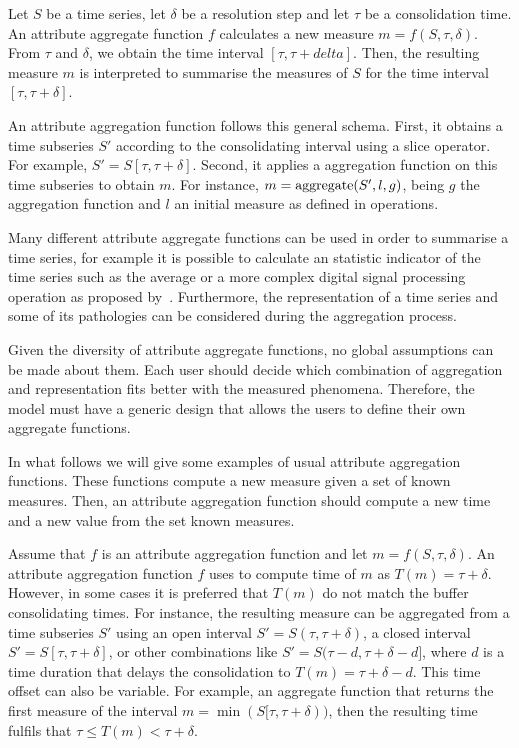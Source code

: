 Let $S$ be a time series, let $\delta$ be a resolution step and let
$\tau$ be a consolidation time.  An attribute aggregate function $f$
calculates a new measure $m=f(S,\tau,\delta)$. From $\tau$ and
$\delta$, we obtain the time interval $[\tau,\tau+delta]$.  Then, the
resulting measure $m$ is interpreted to summarise the measures of $S$
for the time interval $[\tau,\tau+\delta]$.




An attribute aggregation function follows this general schema. First,
it obtains a time subseries $S'$ according to the consolidating
interval using a slice operator. For example, $S' =
S[\tau,\tau+\delta]$. Second, it applies a  aggregation
function on this time subseries to obtain $m$. For instance, $m =
\operatorname*{aggregate}(S',l, g)$, being $g$ the aggregation function and $l$ an initial
measure as defined in  operations.

Many different attribute aggregate functions can be used in order to
summarise a time series, for example it is possible to calculate an
statistic indicator of the time series such as the average or a more
complex digital signal processing operation as proposed
by~\cite{zhang11}. Furthermore, the representation of a time series
and some of its pathologies can be considered during the aggregation
process.

Given the diversity of attribute aggregate functions, no global
assumptions can be made about them. Each user should decide which
combination of aggregation and representation fits better with the
measured phenomena.  Therefore, the  model must have a
generic design that allows the users to define their own aggregate
functions.

In what follows we will give some examples of usual attribute
aggregation functions. These functions compute a new measure given a
set of known measures. Then, an attribute aggregation function should
compute a new time and a new value from the set known measures.
%

Assume that $f$ is an attribute aggregation function and let
$m=f(S,\tau,\delta)$.  An attribute aggregation function $f$ uses to
compute time of $m$ as $T(m)=\tau+\delta$.
%
However, in some cases it is preferred that $T(m)$ do not match the
buffer consolidating times.
%
For instance, the resulting measure can be aggregated from a time
subseries $S'$ using an open interval $S'=S(\tau,\tau+\delta)$, a
closed interval $S'=S[\tau,\tau+\delta]$, or other combinations like
$S'=S(\tau-d,\tau+\delta-d]$, where $d$ is a time duration that delays the
consolidation to $T(m)=\tau+\delta-d$.
%
This time offset can also be variable. For example, an aggregate
function that returns the first measure of the interval
$m=\min(S[\tau,\tau+\delta))$, then the resulting time fulfils that
$\tau\leq T(m) < \tau+\delta$.

